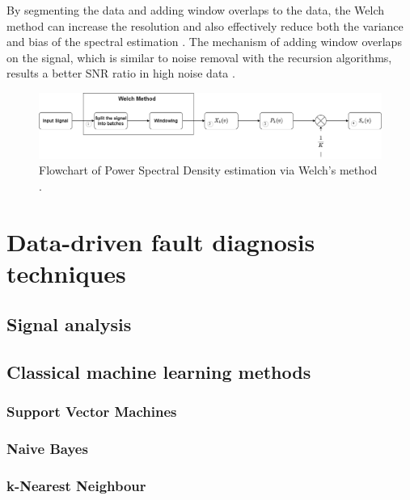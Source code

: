By segmenting the data and adding window overlaps to the data, the Welch method can increase the resolution and also effectively reduce both the variance and bias of the spectral estimation \cite{stoica2005spectral,al2010advanced,zerdani2020inter}. The mechanism of adding window overlaps on the signal, which is similar to noise removal with the recursion algorithms, results a better SNR ratio in high noise data \cite{jwo2021windowing,jin2020intelligent,irvine2002introduction}.

\begin{figure}[h]
	\centering
	\includegraphics[width=400pt,keepaspectratio=true]{./fig/welchdiagram.png}
	\caption{Flowchart of Power Spectral Density estimation via Welch's method \cite{jwo2021windowing}.}	
	\label{welchdiagram}
\end{figure}

\section{Data-driven fault diagnosis techniques}

\subsection{Signal analysis}

\subsection{Classical machine learning methods}

\subsubsection{Support Vector Machines}

\subsubsection{Naive Bayes}

\subsubsection{k-Nearest Neighbour}

